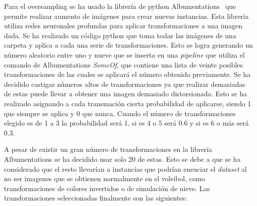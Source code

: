 \documentclass[12pt]{report} %
\begin{document}
    Para el oversampling se ha usado la librería de python
    Albumentations~\cite{albumentations} que permite realizar aumento de
    imágenes para crear nuevas instancias. Esta librería utiliza redes
    neuronales profundas para aplicar transformaciones a una imagen dada.  Se
    ha realizado un código python que toma todas las imágenes de una carpeta y
    aplica a cada una serie de transformaciones. Esto se logra generando un
    número aleatorio entre uno y nueve que se inserta en una \textit{pipeline}
    que utiliza el comando de Albumentations \textit{SomeOf}, que contiene una
    lista de veinte posibles transformaciones de las cuales se aplicará el
    número obtenido previamente. Se ha decidido castigar números altos de
    transformaciones ya que realizar demasiadas de estas puede llevar a obtener
    una imagen demasiado distorsionada. Esto se ha realizado asignando a cada
    transmación cierta probabilidad de aplicarse, siendo 1 que siempre se
    aplica y 0 que nunca. Cuando el número de transformaciones elegido es de 1
    a 3 la probabilidad será 1, si es 4 o 5 será 0.6 y si es 6 o más será 0.3. 

    A pesar de existir un gran número de transformaciones en la librería
    Albumentations se ha decidido usar solo 20 de estas. Esto se debe a que se
    ha considerado que el resto llevarían a instancias que podrían ensuciar el
    \textit{dataset} al no ser imagenes que se obtienen normalmente en el
    voleibol, como transformaciones de colores invertidos o de simulación de
    nieve.  Las transformaciones seleccionadas finalmente son las siguientes:
\end{document}
